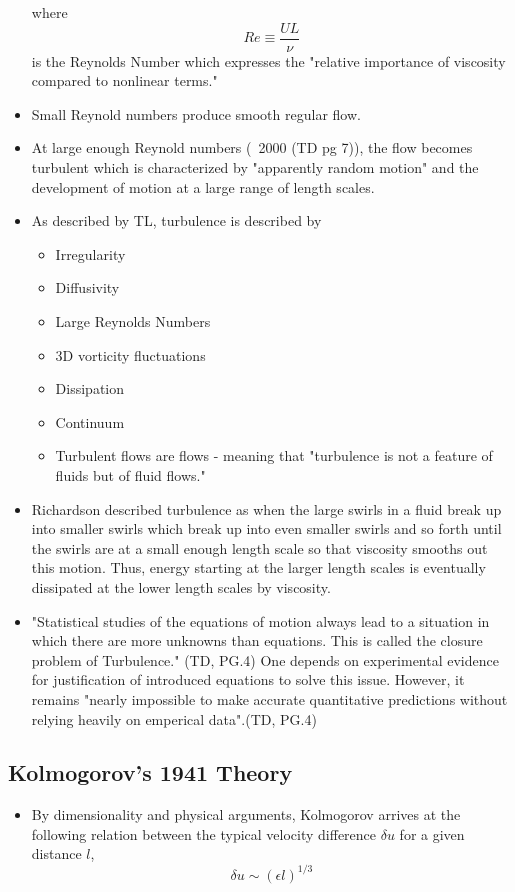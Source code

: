 \documentclass[11pt]{article}
\begin{document}
\begin{itemize}
\begin{equation}
\end{equation}
where \[Re \equiv \frac{UL}{\nu}\] is the Reynolds Number which expresses the "relative importance of viscosity compared to nonlinear terms."
\item Small Reynold numbers produce smooth regular flow.
\item At large enough Reynold numbers (~2000 (TD pg 7)), the flow becomes turbulent which is characterized by "apparently random motion" and the development of motion at a large range of length scales.
\item As described by TL, turbulence is described by
	\begin{itemize}
		\item Irregularity
		\item Diffusivity
		\item Large Reynolds Numbers
		\item 3D vorticity fluctuations
		\item Dissipation
		\item Continuum
		\item Turbulent flows are flows - meaning that "turbulence is not a feature of fluids but of fluid flows."
		
	\end{itemize}
\item Richardson described turbulence as when the large swirls in a fluid break up into smaller swirls which break up into even smaller swirls and so forth until the swirls are at a small enough length scale so that viscosity smooths out this motion. Thus, energy starting at the larger length scales is eventually dissipated at the lower length scales by viscosity. 
\item "Statistical studies of the equations of motion always lead to a situation in which there are more unknowns than equations. This is called the closure problem of Turbulence." (TD, PG.4) One depends on experimental evidence for justification of introduced equations to solve this issue. However, it remains "nearly impossible to make accurate quantitative predictions without relying heavily on emperical data".(TD, PG.4)

\end{itemize}

\subsection{Kolmogorov's 1941 Theory}

\begin{itemize}
	\item By dimensionality and physical arguments, Kolmogorov arrives at the following relation between the typical velocity difference $\delta u$ for a given distance $l$,
	\[\delta u \sim (\epsilon l)^{1/3}\]
\end{itemize}
\end{document}
